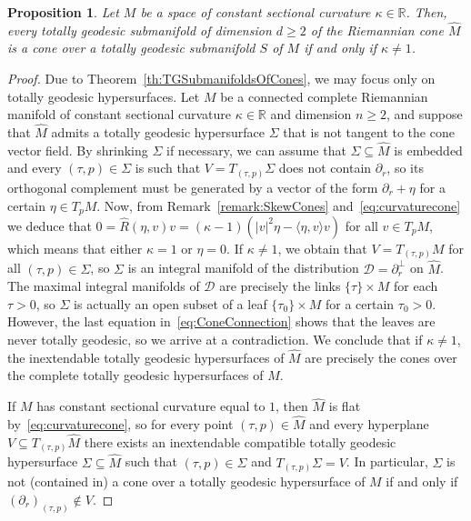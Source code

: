 \documentclass[11pt,a4paper,final]{amsart}
\newcommand{\R}{\mathbb{R}}
\renewcommand{\hat}{\widehat}
\newtheorem{proposition}[theorem]{Proposition}
\theoremstyle{definition}
\begin{document}
\begin{proposition}\label{prop:ConstantCurvatureCone}
	Let $M$ be a space of constant sectional curvature $\kappa\in\R$. Then, every totally geodesic submanifold of dimension $d\ge2$ of the Riemannian cone $\hat{M}$ is a cone over a totally geodesic submanifold $S$ of $M$ if and only if $\kappa\neq1$.	
\end{proposition}	
\begin{proof}
	Due to Theorem~\ref{th:TGSubmanifoldsOfCones}, we may focus only on totally geodesic hypersurfaces.
	Let $M$ be a connected complete Riemannian manifold of constant sectional curvature $\kappa\in \R$ and dimension $n\geq 2$, and suppose that $\hat M$ admits a totally geodesic hypersurface $\Sigma$ that is not tangent to the cone vector field.
	By shrinking $\Sigma$ if necessary, we can assume that $\Sigma\subseteq \hat M$ is embedded and every $(\tau,p)\in\Sigma$ is such that $V=T_{(\tau,p)}\Sigma$ does not contain $\partial_{r}$, so its orthogonal complement must be generated by a vector of the form $\partial_{r}+\eta$ for a certain $\eta\in T_{p}M$.
	Now, from Remark~\ref{remark:SkewCones} and~\eqref{eq:curvaturecone} we deduce that
	$
		0=\hat{R}(\eta,v)v=(\kappa-1)(\lvert v\rvert^{2}\eta-\langle \eta,v \rangle v)
	$
	for all $v\in T_{p}M$, which means that either $\kappa=1$ or $\eta=0$.
	If $\kappa\neq 1$, we obtain that $V=T_{(\tau,p)}M$ for all $(\tau,p)\in \Sigma$, so $\Sigma$ is an integral manifold of the distribution $\mathcal{D}=\partial_{r}^{\perp}$ on $\hat{M}$.
	The maximal integral manifolds of $\mathcal{D}$ are precisely the links $\{\tau\}\times M$ for each $\tau>0$, so $\Sigma$ is actually an open subset of a leaf $\{\tau_{0}\}\times M$ for a certain $\tau_{0}>0$.
	However, the last equation in~\eqref{eq:ConeConnection} shows that the leaves are never totally geodesic, so we arrive at a contradiction.
	We conclude that if $\kappa\neq 1$, the inextendable totally geodesic hypersurfaces of $\hat{M}$ are precisely the cones over the complete totally geodesic hypersurfaces of $M$.
	
	If $M$ has constant sectional curvature equal to $1$, then $\hat{M}$ is flat by~\eqref{eq:curvaturecone}, so for every point $(\tau,p)\in\hat{M}$ and every hyperplane $V\subseteq T_{(\tau,p)}\hat{M}$ there exists an inextendable compatible totally geodesic hypersurface $\Sigma\subseteq \hat{M}$ such that $(\tau,p)\in \Sigma$ and $T_{(\tau,p)}\Sigma=V$.
	In particular, $\Sigma$ is not (contained in) a cone over a totally geodesic hypersurface of $M$ if and only if $(\partial_{r})_{(\tau,p)}\notin V$.
\end{proof}
\end{document}
